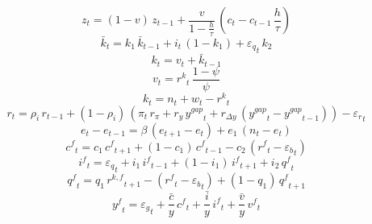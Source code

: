 \begin{dmath}
{{z}}_{t}=\left(1-{{v}}\right)\, {{z}}_{t-1}+\frac{{{v}}}{1-\frac{{{h}}}{{{\tau}}}}\, \left({{c}}_{t}-{{c}}_{t-1}\, \frac{{{h}}}{{{\tau}}}\right)
\end{dmath}
\begin{dmath}
{{\bar{k}}}_{t}={{k_1}}\, {{\bar{k}}}_{t-1}+{{i}}_{t}\, \left(1-{{k_1}}\right)+{{\varepsilon_q}}_{t}\, {{k_2}}
\end{dmath}
\begin{dmath}
{{k}}_{t}={{v}}_{t}+{{\bar{k}}}_{t-1}
\end{dmath}
\begin{dmath}
{{v}}_{t}={{r^{k}}}_{t}\, \frac{1-{{\psi}}}{{{\psi}}}
\end{dmath}
\begin{dmath}
{{k}}_{t}={{n}}_{t}+{{w}}_{t}-{{r^{k}}}_{t}
\end{dmath}
\begin{dmath}
{{r}}_{t}={{\rho_{i}}}\, {{r}}_{t-1}+\left(1-{{\rho_{i}}}\right)\, \left({{\pi}}_{t}\, {{r_{\pi}}}+{{r_{y}}}\, {{y^{gap}}}_{t}+{{r_{\Delta y}}}\, \left({{y^{gap}}}_{t}-{{y^{gap}}}_{t-1}\right)\right)-{{\varepsilon_r}}_{t}
\end{dmath}
\begin{dmath}
{{e}}_{t}-{{e}}_{t-1}={{\beta}}\, \left({{e}}_{t+1}-{{e}}_{t}\right)+{{e_1}}\, \left({{n}}_{t}-{{e}}_{t}\right)
\end{dmath}
\begin{dmath}
{{c^{f}}}_{t}={{c_1}}\, {{c^{f}}}_{t+1}+\left(1-{{c_1}}\right)\, {{c^{f}}}_{t-1}-{{c_2}}\, \left({{r^{f}}}_{t}-{{\varepsilon_b}}_{t}\right)
\end{dmath}
\begin{dmath}
{{i^{f}}}_{t}={{\varepsilon_q}}_{t}+{{i_1}}\, {{i^{f}}}_{t-1}+\left(1-{{i_1}}\right)\, {{i^{f}}}_{t+1}+{{i_2}}\, {{q^{f}}}_{t}
\end{dmath}
\begin{dmath}
{{q^{f}}}_{t}={{q_1}}\, {{r^{k,f}}}_{t+1}-\left({{r^{f}}}_{t}-{{\varepsilon_b}}_{t}\right)+\left(1-{{q_1}}\right)\, {{q^{f}}}_{t+1}
\end{dmath}
\begin{dmath}
{{y^{f}}}_{t}={{\varepsilon_g}}_{t}+{{\frac{\bar{c}}{y}}}\, {{c^{f}}}_{t}+{{\frac{\bar{i}}{y}}}\, {{i^{f}}}_{t}+{{\frac{\bar{v}}{y}}}\, {{v^{f}}}_{t}
\end{dmath}
